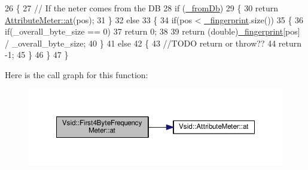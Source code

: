 \begin{DoxyCode}
26 \{
27     \textcolor{comment}{// If the neter comes from the DB}
28     \textcolor{keywordflow}{if} (\hyperlink{class_vsid_1_1_attribute_meter_a2ce3946fc699d3c375ee4019a9e3c022}{\_fromDb})
29     \{
30         \textcolor{keywordflow}{return} \hyperlink{class_vsid_1_1_attribute_meter_a3b067be638ae613a732fa090c07c5e71}{AttributeMeter::at}(pos);
31     \}
32     \textcolor{keywordflow}{else}
33     \{
34         \textcolor{keywordflow}{if}(pos < \hyperlink{class_vsid_1_1_attribute_meter_a0386b2fe9c5d6ab6fba16029d8da4efe}{\_fingerprint}.size())
35         \{
36             \textcolor{keywordflow}{if}(\_overall\_byte\_size == 0)
37                 \textcolor{keywordflow}{return} 0;
38 
39             \textcolor{keywordflow}{return} (\textcolor{keywordtype}{double})\hyperlink{class_vsid_1_1_attribute_meter_a0386b2fe9c5d6ab6fba16029d8da4efe}{\_fingerprint}[pos] / \_overall\_byte\_size;
40         \}
41         \textcolor{keywordflow}{else}
42         \{
43             \textcolor{comment}{//TODO return or throw??}
44             \textcolor{keywordflow}{return} -1;
45         \}
46     \}
47 \}
\end{DoxyCode}


Here is the call graph for this function\-:
\nopagebreak
\begin{figure}[H]
\begin{center}
\leavevmode
\includegraphics[width=350pt]{class_vsid_1_1_first4_byte_frequency_meter_a4ba5a1cd0fc2863a6aec337f980f9b78_cgraph}
\end{center}
\end{figure}


